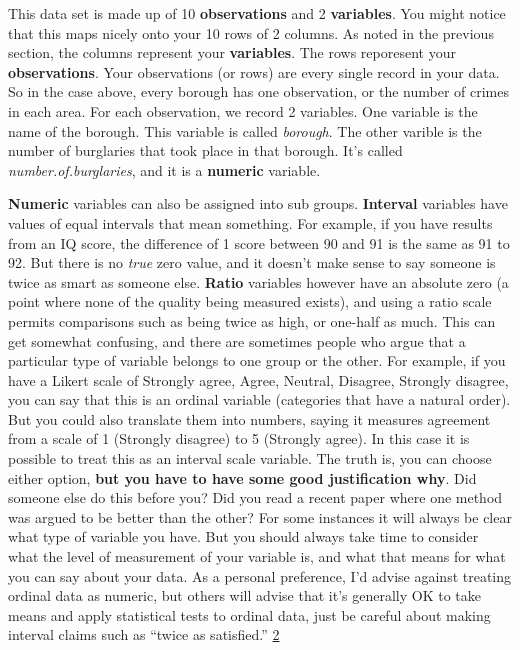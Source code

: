 \documentclass[
]{book}
\begin{document}
This data set is made up of 10 \textbf{observations} and 2 \textbf{variables}. You might notice that this maps nicely onto your 10 rows of 2 columns. As noted in the previous section, the columns represent your \textbf{variables}. The rows reporesent your \textbf{observations}. Your observations (or rows) are every single record in your data. So in the case above, every borough has one observation, or the number of crimes in each area. For each observation, we record 2 variables. One variable is the name of the borough. This variable is called \emph{borough}. The other varible is the number of burglaries that took place in that borough. It's called \emph{number.of.burglaries}, and it is a \textbf{numeric} variable.

\textbf{Numeric} variables can also be assigned into sub groups. \textbf{Interval} variables have values of equal intervals that mean something. For example, if you have results from an IQ score, the difference of 1 score between 90 and 91 is the same as 91 to 92. But there is no \emph{true} zero value, and it doesn't make sense to say someone is twice as smart as someone else. \textbf{Ratio} variables however have an absolute zero (a point where none of the quality being measured exists), and using a ratio scale permits comparisons such as being twice as high, or one-half as much. This can get somewhat confusing, and there are sometimes people who argue that a particular type of variable belongs to one group or the other. For example, if you have a Likert scale of Strongly agree, Agree, Neutral, Disagree, Strongly disagree, you can say that this is an ordinal variable (categories that have a natural order). But you could also translate them into numbers, saying it measures agreement from a scale of 1 (Strongly disagree) to 5 (Strongly agree). In this case it is possible to treat this as an interval scale variable. The truth is, you can choose either option, \textbf{but you have to have some good justification why}. Did someone else do this before you? Did you read a recent paper where one method was argued to be better than the other? For some instances it will always be clear what type of variable you have. But you should always take time to consider what the level of measurement of your variable is, and what that means for what you can say about your data. As a personal preference, I'd advise against treating ordinal data as numeric, but others will advise that it's generally OK to take means and apply statistical tests to ordinal data, just be careful about making interval claims such as ``twice as satisfied.'' \href{http://www.usablestats.com/lessons/noir}{2}
\end{document}
